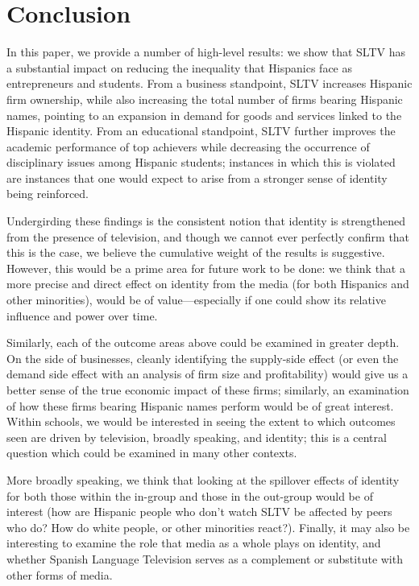 \documentclass[11pt]{article}
\begin{document}
\section{Conclusion} \label{secconcl}

In this paper, we provide a number of high-level results: we show that SLTV has a substantial impact on reducing the inequality that Hispanics face as entrepreneurs and students. From a business standpoint, SLTV increases Hispanic firm ownership, while also increasing the total number of firms bearing Hispanic names, pointing to an expansion in demand for goods and services linked to the Hispanic identity. From an educational standpoint, SLTV further improves the academic performance of top achievers while decreasing the occurrence of disciplinary issues among Hispanic students; instances in which this is violated are instances that one would expect to arise from a stronger sense of identity being reinforced. 

Undergirding these findings is the consistent notion that identity is strengthened from the presence of television, and though we cannot ever perfectly confirm that this is the case, we believe the cumulative weight of the results is suggestive. However, this would be a prime area for future work to be done: we think that a more precise and direct effect on identity from the media (for both Hispanics and other minorities), would be of value---especially if one could show its relative influence and power over time.

Similarly, each of the outcome areas above could be examined in greater depth. On the side of businesses, cleanly identifying the supply-side effect (or even the demand side effect with an analysis of firm size and profitability) would give us a better sense of the true economic impact of these firms; similarly, an examination of how these firms bearing Hispanic names perform would be of great interest. Within schools, we would be interested in seeing the extent to which outcomes seen are driven by television, broadly speaking, and identity; this is a central question which could be examined in many other contexts. 

More broadly speaking, we think that looking at the spillover effects of identity for both those within the in-group and those in the out-group would be of interest (how are Hispanic people who don't watch SLTV be affected by peers who do? How do white people, or other minorities react?). Finally, it may also be interesting to examine the role that media as a whole plays on identity, and whether Spanish Language Television serves as a complement or substitute with other forms of media.
\end{document}
